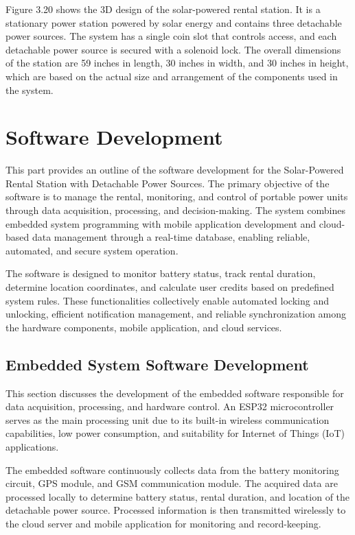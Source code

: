 {Figure 3.20 shows the 3D design of the solar-powered rental station. It is a stationary power station powered by solar energy and contains three detachable power sources. The system has a single coin slot that controls access, and each detachable power source is secured with a solenoid lock. The overall dimensions of the station are 59 inches in length, 30 inches in width, and 30 inches in height, which are based on the actual size and arrangement of the components used in the system.
\section{Software Development}
This part provides an outline of the software development for the Solar-Powered Rental Station with Detachable Power Sources. The primary objective of the software is to manage the rental, monitoring, and control of portable power units through data acquisition, processing, and decision-making. The system combines embedded system programming with mobile application development and cloud-based data management through a real-time database, enabling reliable, automated, and secure system operation.

The software is designed to monitor battery status, track rental duration, determine location coordinates, and calculate user credits based on predefined system rules. These functionalities collectively enable automated locking and unlocking, efficient notification management, and reliable synchronization among the hardware components, mobile application, and cloud services.

\subsection{Embedded System Software Development}
This section discusses the development of the embedded software responsible for data acquisition, processing, and hardware control. An ESP32 microcontroller serves as the main processing unit due to its built-in wireless communication capabilities, low power consumption, and suitability for Internet of Things (IoT) applications.

The embedded software continuously collects data from the battery monitoring circuit, GPS module, and GSM communication module. The acquired data are processed locally to determine battery status, rental duration, and location of the detachable power source. Processed information is then transmitted wirelessly to the cloud server and mobile application for monitoring and record-keeping.

}

